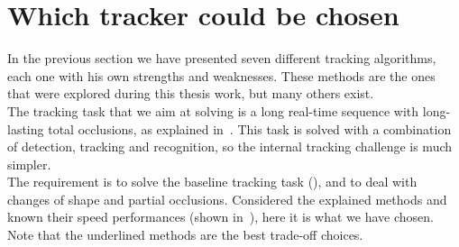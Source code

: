 \section{Which tracker could be chosen}
In the previous section we have presented seven different tracking algorithms, each one with his own strengths and weaknesses. These methods are the ones that were explored during this thesis work, but many others exist.\\
The tracking task that we aim at solving is a long real-time sequence with long-lasting total occlusions, as explained in~. This task is solved with a combination of detection, tracking and recognition, so the internal tracking challenge is much simpler.\\
The requirement is to solve the baseline tracking task (), and to deal with changes of shape and partial occlusions. Considered the explained methods and known their speed performances (shown in~), here it is what we have chosen. Note that the underlined methods are the best trade-off choices. 
